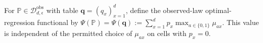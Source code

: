 For \(\mathbb P\in\mathcal D_{d,\epsilon}^{\mathrm{obs}}\) with table \(\mathbf q=(q_x)_{x=1}^d\), define the observed-law optimal-regression functional by \(\Psi(\mathbb P)=\Psi(\mathbf q):=\sum_{x=1}^d p_x\max_{a\in\{0,1\}}\mu_{ax}\).  This value is independent of the permitted choice of \(\mu_{ax}\) on cells with \(p_x=0\).